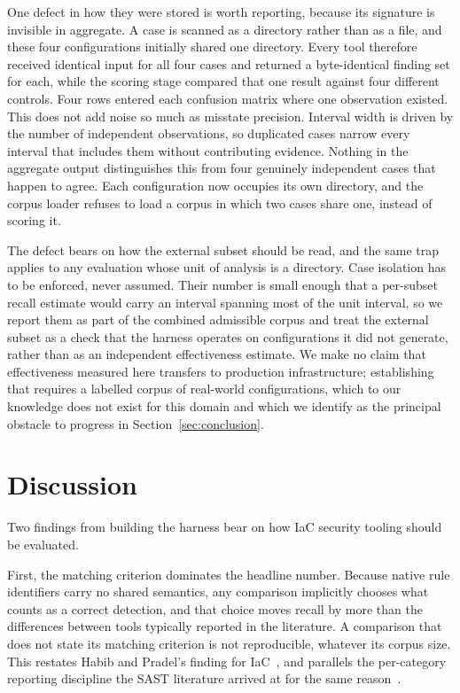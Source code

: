 \documentclass[journal]{IEEEtran}
\begin{document}
One defect in how they were stored is worth reporting, because its signature is
invisible in aggregate. A case is scanned as a directory rather than as a file, and
these four configurations initially shared one directory. Every tool therefore
received identical input for all four cases and returned a byte-identical finding
set for each, while the scoring stage compared that one result against four
different controls. Four rows entered each confusion matrix where one observation
existed. This does not add noise so much as misstate precision. Interval width is
driven by the number of independent observations, so duplicated cases narrow every
interval that includes them without contributing evidence. Nothing in the aggregate
output distinguishes this from four genuinely independent cases that happen to
agree. Each configuration now occupies its own directory, and the corpus loader
refuses to load a corpus in which two cases share one, instead of scoring it.

The defect bears on how the external subset should be read, and the same trap
applies to any evaluation whose unit of analysis is a directory. Case isolation
has to be enforced, never assumed.
Their number is small enough that a per-subset recall estimate would carry an
interval spanning most of the unit interval, so we report them as part of the
combined admissible corpus and treat the external subset as a check that the
harness operates on configurations it did not generate, rather than as an
independent effectiveness estimate. We make no claim that effectiveness measured
here transfers to production infrastructure; establishing that requires a
labelled corpus of real-world configurations, which to our knowledge does not
exist for this domain and which we identify as the principal obstacle to
progress in Section~\ref{sec:conclusion}.

\section{Discussion}

Two findings from building the harness bear on how IaC security tooling should be
evaluated.

First, the matching criterion dominates the headline number. Because native rule
identifiers carry no shared semantics, any comparison implicitly chooses what
counts as a correct detection, and that choice moves recall by more than the
differences between tools typically reported in the literature. A comparison that
does not state its matching criterion is not reproducible, whatever its corpus
size. This restates Habib and Pradel's finding for IaC~\cite{habib2018howmany},
and parallels the per-category reporting discipline the SAST literature arrived at
for the same reason~\cite{li2023sast}.
\end{document}
